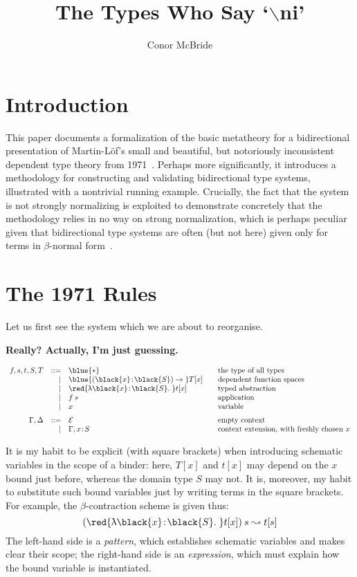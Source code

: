 \documentclass[natbib]{article}
\newcommand{\type}{\blue{\ast}}
\newcommand{\hb}{\!:\!}
\newcommand{\PI}[2]{\blue{(\black{#1}\hb \black{#2})\to\;}}
\newcommand{\LT}[2]{\red{\uplambda\black{#1}\hb \black{#2}.\;}}
\newcommand{\EC}{\mathcal{E}}
\begin{document}
\title{The Types Who Say `$\backslash$ni'}
\author{Conor McBride}
\maketitle

\section{Introduction}

This paper documents a formalization of the basic metatheory for a bidirectional presentation of Martin-L\"of's small and beautiful, but notoriously inconsistent dependent type theory from 1971~\cite{martinloef:atheoryoftypes}. Perhaps more significantly, it introduces a methodology for constructing and validating bidirectional type systems, illustrated with a nontrivial running example. Crucially, the fact that the system is not strongly normalizing is exploited to demonstrate concretely that the methodology relies in no way on strong normalization, which is perhaps peculiar given that bidirectional type systems are often (but not here) given only for terms in $\beta$-normal form~\cite{DBLP:journals/toplas/PierceT00}.


\section{The 1971 Rules}

Let us first see the system which we are about to reorganise.

\textbf{Really? Actually, I'm just guessing.}

\[\begin{array}{rrl@{\qquad}l}
f,s,t,S,T & ::= & \type & \mbox{the type of all types} \\
          &   | & \PI xS T[x] & \mbox{dependent function spaces} \\
          &   | & \LT xS t[x] & \mbox{typed abstraction} \\
          &   | & f\:s        & \mbox{application} \\
          &   | & x           & \mbox{variable} \medskip\\
\Gamma,\Delta & ::= & \EC & \mbox{empty context} \\
              &   | & \Gamma,x\hb S & \mbox{context extension, with freshly chosen $x$}
\end{array}\]

It is my habit to be explicit (with square brackets) when introducing schematic variables in the scope of a binder: here, $T[x]$ and $t[x]$ may depend on the $x$ bound just before, whereas the domain type $S$ may not. It is, moreover, my habit to substitute such bound variables just by writing terms in the square brackets. For example, the $\beta$-contraction scheme is given thus:
\[
(\LT xS t[x])\:s \leadsto t[s]
\]
The left-hand side is a \emph{pattern}, which establishes schematic variables and makes clear their scope;
the right-hand side is an \emph{expression}, which must explain how the bound variable is instantiated.
\end{document}

